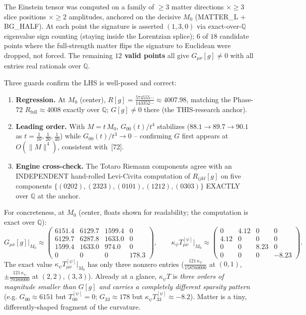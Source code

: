 The Einstein tensor was computed on a family of $\geq3$ matter directions $\times\geq3$
slice positions $\times\geq2$ amplitudes, anchored on the decisive $M_0$ (MATTER\_L +
BG\_HALF). At each point the signature is asserted $(1,3,0)$ via exact-over-$\mathbb{Q}$
eigenvalue sign counting (staying inside the Lorentzian splice); $6$ of $18$ candidate
points where the full-strength matter flips the signature to Euclidean were dropped, not
forced. The remaining \textbf{$12$ valid points} all give $G_{\mu\nu}[g]\neq0$ with all
entries real rationals over $\mathbb{Q}$.

Three guards confirm the LHS is well-posed and correct:
\begin{enumerate}
\item \textbf{Regression.} At $M_0$ (center), $R[g]=\tfrac{574555\cdots}{143352\cdots}
  \approx 4007.98$, matching the Phase-72 $R_{\mathrm{full}}\approx4008$ exactly over
  $\mathbb{Q}$; $G[g]\neq0$ there (the THIS-research anchor).
\item \textbf{Leading order.} With $M=t\,M_0$, $G_{00}(t)/t^4$ stabilizes
  ($88.1\to89.7\to90.1$ as $t=\tfrac1{10},\tfrac1{20},\tfrac1{40}$) while $G_{00}(t)/t^3
  \to0$ -- confirming $G$ first appears at $O(\|M\|^4)$, consistent with~[72].
\item \textbf{Engine cross-check.} The Totaro Riemann components agree with an
  INDEPENDENT hand-rolled Levi-Civita computation of $R_{ijkl}[g]$ on five components
  $\{(0202),(2323),(0101),(1212),(0303)\}$ EXACTLY over $\mathbb{Q}$ at the anchor.
\end{enumerate}
For concreteness, at $M_0$ (center, floats shown for readability; the computation is
exact over $\mathbb{Q}$):
\begin{equation}
  G_{\mu\nu}[g]\big|_{M_0}\approx
  \begin{pmatrix}
    6151.4 & 6129.7 & 1599.4 & 0\\
    6129.7 & 6287.8 & 1633.0 & 0\\
    1599.4 & 1633.0 & 974.0 & 0\\
    0 & 0 & 0 & 178.3
  \end{pmatrix},
  \qquad
  \kappa_\psi T^{[\psi]}_{\mu\nu}\big|_{M_0}\approx
  \begin{pmatrix}
    0 & 4.12 & 0 & 0\\
    4.12 & 0 & 0 & 0\\
    0 & 0 & 8.23 & 0\\
    0 & 0 & 0 & -8.23
  \end{pmatrix}.
  \label{eq:GvsKT}
\end{equation}
The exact value $\kappa_\psi T^{[\psi]}_{\mu\nu}|_{M_0}$ has only three nonzero entries
($\tfrac{121\,\kappa_\psi}{158760000}$ at $(0,1)$, $\pm\tfrac{121\,\kappa_\psi}{79380000}$
at $(2,2),(3,3)$). Already at a glance, $\kappa_\psi T$ is \emph{three orders of magnitude
smaller than $G[g]$ and carries a completely different sparsity pattern} (e.g.
$G_{00}\approx6151$ but $T^{[\psi]}_{00}=0$; $G_{33}\approx178$ but $\kappa_\psi
T^{[\psi]}_{33}\approx-8.2$). Matter is a tiny, differently-shaped fragment of the
curvature.

